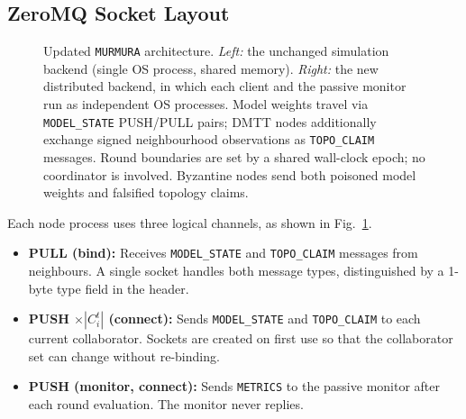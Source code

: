 \documentclass[journal]{IEEEtran}
\newenvironment{added}{\begingroup\color{addedcolor}}{\endgroup}
\theoremstyle{definition}
\theoremstyle{remark}
\begin{document}
\subsection{ZeroMQ Socket Layout}
\label{sec:zmq_layout}

\begin{added}
\begin{figure}[t]
\centering
\caption{Updated \texttt{MURMURA} architecture. \emph{Left:} the unchanged simulation backend (single OS process, shared memory). \emph{Right:} the new distributed backend, in which each client and the passive monitor run as independent OS processes. Model weights travel via \texttt{MODEL\_STATE} PUSH/PULL pairs; DMTT nodes additionally exchange signed neighbourhood observations as \texttt{TOPO\_CLAIM} messages. Round boundaries are set by a shared wall-clock epoch; no coordinator is involved. Byzantine nodes send both poisoned model weights and falsified topology claims.}
\label{fig:architecture}
\end{figure}

Each node process uses three logical channels, as shown in Fig.~\ref{fig:architecture}.

\begin{itemize}[leftmargin=2em]
  \item \textbf{PULL (bind):} Receives \texttt{MODEL\_STATE} and \texttt{TOPO\_CLAIM} messages from neighbours. A single socket handles both message types, distinguished by a 1-byte type field in the header.
  \item \textbf{PUSH $\times |C_i^t|$ (connect):} Sends \texttt{MODEL\_STATE} and \texttt{TOPO\_CLAIM} to each current collaborator. Sockets are created on first use so that the collaborator set can change without re-binding.
  \item \textbf{PUSH (monitor, connect):} Sends \texttt{METRICS} to the passive monitor after each round evaluation. The monitor never replies.
\end{itemize}


\end{added}
\end{document}
